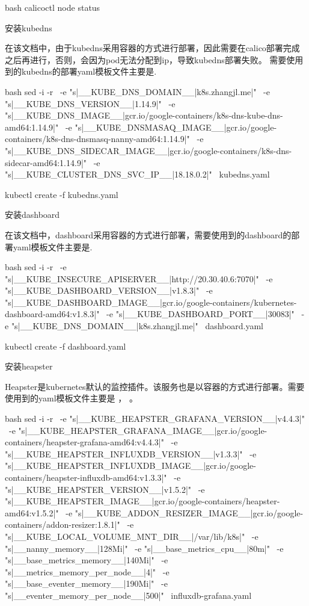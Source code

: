 \begin{outline}[enumerate]
\begin{code-block}{bash}
calicoctl node status
\end{code-block}

\1 安装kubedns

在该文档中，由于kubedns采用容器的方式进行部署，因此需要在calico部署完成之后再进行，否则，会因为pod无法分配到ip，导致kubedns部署失败。
需要使用到的kubedns的部署yaml模板文件主要是.
\begin{code-block}{bash}
sed -i -r \
    -e "s|__KUBE_DNS_DOMAIN__|k8s.zhangjl.me|" \
    -e "s|__KUBE_DNS_VERSION__|1.14.9|" \
    -e "s|__KUBE_DNS_IMAGE__|gcr.io/google-containers/k8s-dns-kube-dns-amd64:1.14.9|" \
    -e "s|__KUBE_DNSMASAQ_IMAGE__|gcr.io/google-containers/k8s-dns-dnsmasq-nanny-amd64:1.14.9|" \
    -e "s|__KUBE_DNS_SIDECAR_IMAGE__|gcr.io/google-containers/k8s-dns-sidecar-amd64:1.14.9|" \
    -e "s|__KUBE_CLUSTER_DNS_SVC_IP__|18.18.0.2|" \
    kubedns.yaml

kubectl create -f kubedns.yaml
\end{code-block}

\1 安装dashboard

在该文档中，dashboard采用容器的方式进行部署，需要使用到的dashboard的部署yaml模板文件主要是.
\begin{code-block}{bash}
    sed -i -r \
    -e "s|__KUBE_INSECURE_APISERVER__|http://20.30.40.6:7070|" \
    -e "s|__KUBE_DASHBOARD_VERSION__|v1.8.3|" \
    -e "s|__KUBE_DASHBOARD_IMAGE__|gcr.io/google-containers/kubernetes-dashboard-amd64:v1.8.3|" \
    -e "s|__KUBE_DASHBOARD_PORT__|30083|" \
    -e "s|__KUBE_DNS_DOMAIN__|k8s.zhangjl.me|" \
    dashboard.yaml

kubectl create -f dashboard.yaml
\end{code-block}

\1 安装heapster

Heapster是kubernetes默认的监控插件。该服务也是以容器的方式进行部署。需要使用到的yaml模板文件主要是
，
。
\begin{code-block}{bash}
sed -i -r \
    -e "s|__KUBE_HEAPSTER_GRAFANA_VERSION__|v4.4.3|" \
    -e "s|__KUBE_HEAPSTER_GRAFANA_IMAGE__|gcr.io/google-containers/heapster-grafana-amd64:v4.4.3|" \
    -e "s|__KUBE_HEAPSTER_INFLUXDB_VERSION__|v1.3.3|" \
    -e "s|__KUBE_HEAPSTER_INFLUXDB_IMAGE__|gcr.io/google-containers/heapster-influxdb-amd64:v1.3.3|" \
    -e "s|__KUBE_HEAPSTER_VERSION__|v1.5.2|" \
    -e "s|__KUBE_HEAPSTER_IMAGE__|gcr.io/google-containers/heapster-amd64:v1.5.2|" \
    -e "s|__KUBE_ADDON_RESIZER_IMAGE__|gcr.io/google-containers/addon-resizer:1.8.1|" \
    -e "s|__KUBE_LOCAL_VOLUME_MNT_DIR__|/var/lib/k8s|" \
    -e "s|__nanny_memory__|128Mi|" \
    -e "s|__base_metrics_cpu__|80m|" \
    -e "s|__base_metrics_memory__|140Mi|" \
    -e "s|__metrics_memory_per_node__|4|" \
    -e "s|__base_eventer_memory__|190Mi|" \
    -e "s|__eventer_memory_per_node__|500|" \
    influxdb-grafana.yaml


\end{code-block}
\end{outline}
